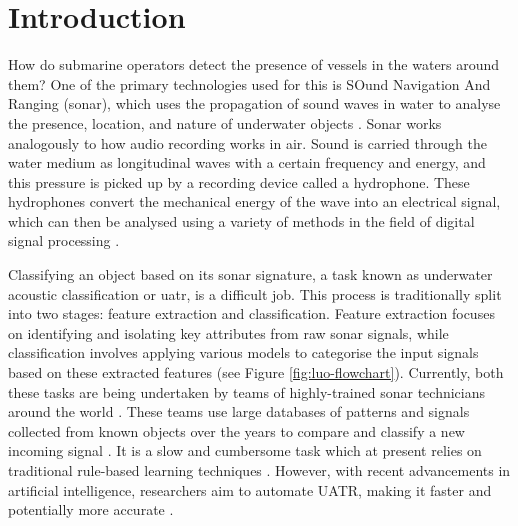 \chapter{Introduction}


How do submarine operators detect the presence of vessels in the waters around them? One of the primary technologies used for this is SOund Navigation And Ranging (sonar), which uses the propagation of sound waves in water to analyse the presence, location, and nature of underwater objects \cite{niu_advances_2023}. Sonar works analogously to how audio recording works in air. Sound is carried through the water medium as longitudinal waves with a certain frequency and energy, and this pressure is picked up by a recording device called a hydrophone. These hydrophones convert the mechanical energy of the wave into an electrical signal, which can then be analysed using a variety of methods in the field of digital signal processing \cite{waite_sonar_2002, domingos_survey_2022}.

Classifying an object based on its sonar signature, a task known as underwater acoustic classification or \acrfull{uatr}, is a difficult job. This process is traditionally split into two stages: feature extraction and classification. Feature extraction focuses on identifying and isolating key attributes from raw sonar signals, while classification involves applying various models to categorise the input signals based on these extracted features (see Figure \ref{fig:luo-flowchart}). Currently, both these tasks are being undertaken by teams of highly-trained sonar technicians around the world \cite{aslam_underwater_2024}. These teams use large databases of patterns and signals collected from known objects over the years to compare and classify a new incoming signal \cite{niu_advances_2023}. It is a slow and cumbersome task which at present relies on traditional rule-based learning techniques \cite{neupane_review_2020}.  However, with recent advancements in artificial intelligence, researchers aim to automate UATR, making it faster and potentially more accurate \cite{aslam_underwater_2024, neupane_review_2020}.

